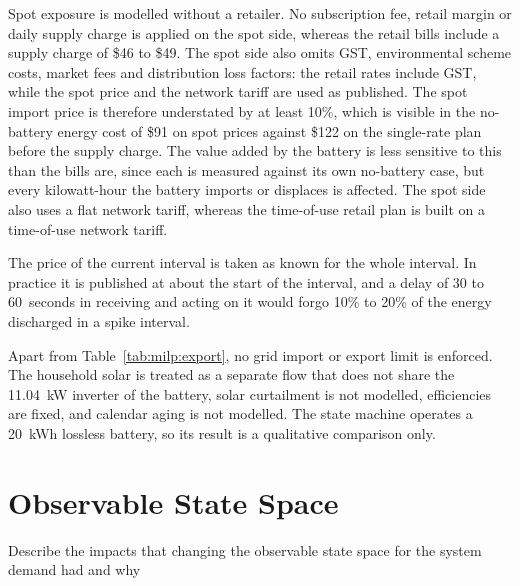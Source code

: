 Spot exposure is modelled without a retailer. No subscription fee, retail margin or
daily supply charge is applied on the spot side, whereas the retail bills include a
supply charge of \$46 to \$49. The spot side also omits GST, environmental scheme
costs, market fees and distribution loss factors: the retail rates include GST, while
the spot price and the network tariff are used as published.
The spot import price is therefore understated by at least 10\%, which is visible in the
no-battery energy cost of \$91 on spot prices against \$122 on the single-rate plan
before the supply charge. The value added by the battery is less sensitive to this than
the bills are, since each is measured against its own no-battery case, but every
kilowatt-hour the battery imports or displaces is affected. The spot side also uses a
flat network tariff, whereas the time-of-use retail plan is built on a time-of-use
network tariff.

The price of the current interval is taken as known for the whole interval. In practice
it is published at about the start of the interval, and a delay of 30 to 60~seconds in
receiving and acting on it would forgo 10\% to 20\% of the energy discharged in a spike
interval.

Apart from Table~\ref{tab:milp:export}, no grid import or export limit is enforced. The
household solar is treated as a separate flow that does not share the 11.04~kW inverter
of the battery, solar curtailment is not modelled, efficiencies are fixed, and calendar
aging is not modelled. The state machine operates a 20~kWh lossless battery, so its
result is a qualitative comparison only.

\section{Observable State Space}
\label{sec:analysis:observable_state}
Describe the impacts that changing the observable state space for the system demand had and why